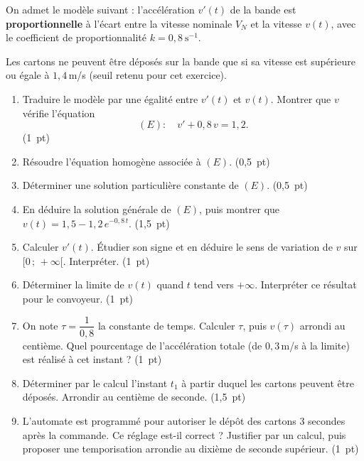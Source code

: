 \documentclass[a4paper,11pt]{article}
\newcommand{\rep}[1]{\par\noindent\begin{minipage}[t][#1cm]{\linewidth}\mbox{}\end{minipage}\par}
\newcommand{\pts}[1]{\unskip\nobreak\hfill\mbox{\small\color{uimmgray}(#1)}}
\begin{document}
On admet le modèle suivant : l'accélération $v'(t)$ de la bande est \textbf{proportionnelle} à l'écart entre la vitesse nominale $V_N$ et la vitesse $v(t)$, avec le coefficient de proportionnalité $k = 0{,}8\ \text{s}^{-1}$.

Les cartons ne peuvent être déposés sur la bande que si sa vitesse est supérieure ou égale à $1{,}4$\,m/s (seuil retenu pour cet exercice).

\begin{enumerate}
  \needspace{4.6cm}
  \item Traduire le modèle par une égalité entre $v'(t)$ et $v(t)$. Montrer que $v$ vérifie l'équation \[ (E) : \quad v' + 0{,}8\,v = 1{,}2 . \] \pts{1 pt}
  \rep{3.0}
  \needspace{3.1cm}
  \item Résoudre l'équation homogène associée à $(E)$. \pts{0,5 pt}
  \rep{1.5}
  \needspace{3.1cm}
  \item Déterminer une solution particulière constante de $(E)$. \pts{0,5 pt}
  \rep{1.5}
  \needspace{5.6cm}
  \item En déduire la solution générale de $(E)$, puis montrer que $v(t) = 1{,}5 - 1{,}2\,e^{-0{,}8\,t}$. \pts{1,5 pt}
  \rep{4.0}
  \needspace{4.6cm}
  \item Calculer $v'(t)$. Étudier son signe et en déduire le sens de variation de $v$ sur $[0\,;\,+\infty[$. Interpréter. \pts{1 pt}
  \rep{3.0}
  \needspace{3.6cm}
  \item Déterminer la limite de $v(t)$ quand $t$ tend vers $+\infty$. Interpréter ce résultat pour le convoyeur. \pts{1 pt}
  \rep{2.0}
  \needspace{4.6cm}
  \item On note $\tau = \dfrac{1}{0{,}8}$ la constante de temps. Calculer $\tau$, puis $v(\tau)$ arrondi au centième. Quel pourcentage de l'accélération totale (de $0{,}3$\,m/s à la limite) est réalisé à cet instant ? \pts{1 pt}
  \rep{3.0}
  \needspace{5.6cm}
  \item Déterminer par le calcul l'instant $t_1$ à partir duquel les cartons peuvent être déposés. Arrondir au centième de seconde. \pts{1,5 pt}
  \rep{4.0}
  \needspace{4.6cm}
  \item L'automate est programmé pour autoriser le dépôt des cartons $3$ secondes après la commande. Ce réglage est-il correct ? Justifier par un calcul, puis proposer une temporisation arrondie au dixième de seconde supérieur. \pts{1 pt}
  \rep{3.0}
\end{enumerate}
\end{document}
